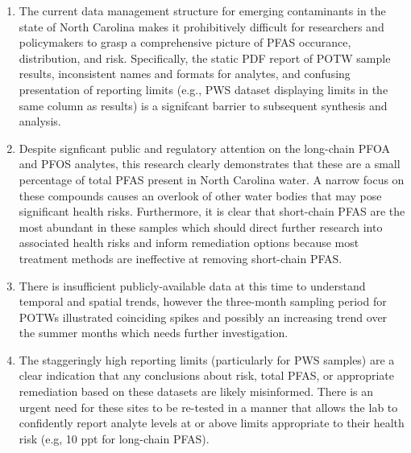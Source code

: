 \documentclass[
  12pt,
]{article}
\begin{document}
\begin{enumerate}
\def\labelenumi{\arabic{enumi}.}
\item
  The current data management structure for emerging contaminants in the
  state of North Carolina makes it prohibitively difficult for
  researchers and policymakers to grasp a comprehensive picture of PFAS
  occurance, distribution, and risk. Specifically, the static PDF report
  of POTW sample results, inconsistent names and formats for analytes,
  and confusing presentation of reporting limits (e.g., PWS dataset
  displaying limits in the same column as results) is a signifcant
  barrier to subsequent synthesis and analysis.
\item
  Despite signficant public and regulatory attention on the long-chain
  PFOA and PFOS analytes, this research clearly demonstrates that these
  are a small percentage of total PFAS present in North Carolina water.
  A narrow focus on these compounds causes an overlook of other water
  bodies that may pose significant health risks. Furthermore, it is
  clear that short-chain PFAS are the most abundant in these samples
  which should direct further research into associated health risks and
  inform remediation options because most treatment methods are
  ineffective at removing short-chain PFAS.
\item
  There is insufficient publicly-available data at this time to
  understand temporal and spatial trends, however the three-month
  sampling period for POTWs illustrated coinciding spikes and possibly
  an increasing trend over the summer months which needs further
  investigation.
\item
  The staggeringly high reporting limits (particularly for PWS samples)
  are a clear indication that any conclusions about risk, total PFAS, or
  appropriate remediation based on these datasets are likely
  misinformed. There is an urgent need for these sites to be re-tested
  in a manner that allows the lab to confidently report analyte levels
  at or above limits appropriate to their health risk (e.g, 10 ppt for
  long-chain PFAS).
\end{enumerate}
\end{document}
